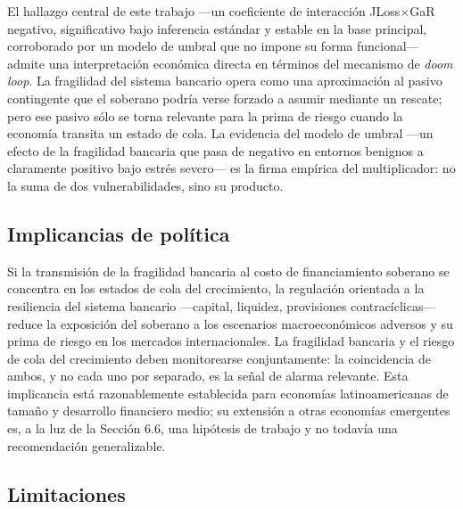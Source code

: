 \documentclass[5p,times,twocolumn,authoryear]{elsarticle}
\begin{document}
El hallazgo central de este trabajo —un coeficiente de interacción JLoss$\times$GaR negativo, significativo bajo inferencia estándar y estable en la base principal, corroborado por un modelo de umbral que no impone su forma funcional— admite una interpretación económica directa en términos del mecanismo de \textit{doom loop}. La fragilidad del sistema bancario opera como una aproximación al pasivo contingente que el soberano podría verse forzado a asumir mediante un rescate; pero ese pasivo sólo se torna relevante para la prima de riesgo cuando la economía transita un estado de cola. La evidencia del modelo de umbral —un efecto de la fragilidad bancaria que pasa de negativo en entornos benignos a claramente positivo bajo estrés severo— es la firma empírica del multiplicador: no la suma de dos vulnerabilidades, sino su producto.

\subsection{Implicancias de política}

Si la transmisión de la fragilidad bancaria al costo de financiamiento soberano se concentra en los estados de cola del crecimiento, la regulación orientada a la resiliencia del sistema bancario —capital, liquidez, provisiones contracíclicas— reduce la exposición del soberano a los escenarios macroeconómicos adversos y su prima de riesgo en los mercados internacionales. La fragilidad bancaria y el riesgo de cola del crecimiento deben monitorearse conjuntamente: la coincidencia de ambos, y no cada uno por separado, es la señal de alarma relevante. Esta implicancia está razonablemente establecida para economías latinoamericanas de tamaño y desarrollo financiero medio; su extensión a otras economías emergentes es, a la luz de la Sección 6.6, una hipótesis de trabajo y no todavía una recomendación generalizable.

\subsection{Limitaciones}
\end{document}
